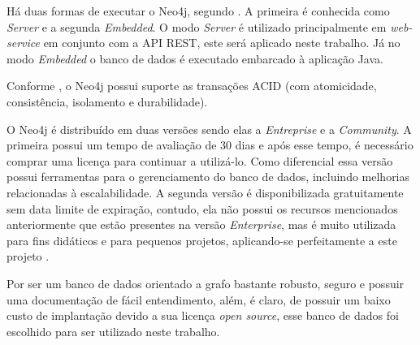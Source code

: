 \newpage
\par Há duas formas de executar o Neo4j, segundo . A primeira é conhecida como \textit{Server} e a segunda \textit{Embedded}. O modo \textit{Server} é utilizado principalmente em \textit{web-service} em conjunto com a API REST, este será aplicado neste trabalho. Já no modo \textit{Embedded} o banco de dados é executado embarcado à aplicação Java.

\par Conforme , o Neo4j possui suporte as transações ACID (com atomicidade, consistência, isolamento e durabilidade).

O Neo4j é distribuído em duas versões sendo elas a \textit{Entreprise} e a \textit{Community}. A primeira possui um tempo de avaliação de 30 dias e após esse tempo, é necessário comprar uma licença para continuar a utilizá-lo. Como diferencial essa versão possui ferramentas para o gerenciamento do banco de dados, incluindo melhorias relacionadas à escalabilidade. A segunda versão é disponibilizada gratuitamente sem data limite de expiração, contudo, ela não possui os recursos mencionados anteriormente que estão presentes na versão \textit{Enterprise}, mas é muito utilizada para fins didáticos e para pequenos projetos, aplicando-se perfeitamente a este projeto \cite{neo4j_team_manual}.

\par Por ser um banco de dados orientado a grafo bastante robusto, seguro e possuir uma documentação de fácil entendimento, além, é claro, de possuir um baixo custo de implantação devido a sua licença \textit{open source}, esse banco de dados foi escolhido para ser utilizado neste trabalho.
